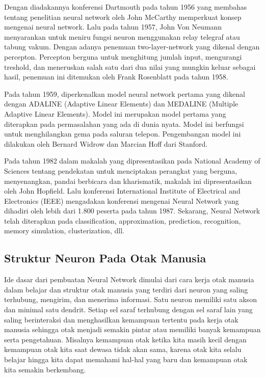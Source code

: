 Dengan diadakannya konferensi Dartmouth pada tahun 1956 yang membahas tentang penelitian neural network oleh John McCarthy memperkuat konsep mengenai neural network. Lalu pada tahun 1957, John Von Neumann menyarankan untuk meniru fungsi neuron menggunakan relay telegraf atau tabung vakum. Dengan adanya penemuan two-layer-network yang dikenal dengan percepton. Percepton berguna untuk menghitung jumlah input, mengurangi treshold, dan meneruskan salah satu dari dua nilai yang mungkin keluar sebagai hasil, penemuan ini ditemukan oleh Frank Rosenblatt pada tahun 1958. 

Pada tahun 1959, diperkenalkan model neural network pertama yang dikenal dengan ADALINE (Adaptive Linear Elements) dan MEDALINE (Multiple Adaptive Linear Elements). Model ini merupakan model pertama yang diterapkan pada permasalahan yang ada di dunia nyata. Model ini berfungsi untuk menghilangkan gema pada saluran telepon. Pengembangan model ini dilakukan oleh Bernard Widrow dan Marcian Hoff dari Stanford.

Pada tahun 1982 dalam makalah yang dipresentasikan pada National Academy of Sciences tentang pendekatan untuk menciptakan perangkat yang berguna, menyenangkan, pandai berbicara dan kharismatik, makalah ini dipresentasikan oleh John Hopfield. Lalu konferensi International Institute of Electrical and Electronics (IEEE) mengadakan konferensi mengenai Neural Network yang dihadiri oleh lebih dari 1.800 peserta pada tahun 1987. Sekarang, Neural Network telah diterapkan pada classification, approximation, prediction, recognition, memory simulation, clusterization, dll. 

\subsection{Struktur Neuron Pada Otak Manusia}
Ide dasar dari pembuatan Neural Network dimulai dari cara kerja otak manusia dalam belajar dan struktur otak manusia yang terdiri dari neuron yang saling terhubung, mengirim, dan menerima informasi. Satu neuron memiliki satu akson dan minimal satu dendrit. Setiap sel saraf terhubung dengan sel saraf lain yang saling berinteraksi dan menghasilkan kemampuan tertentu pada kerja otak manusia sehingga otak menjadi semakin pintar atau memiliki banyak kemampuan serta pengetahuan. Misalnya kemampuan otak ketika kita masih kecil dengan kemampuan otak kita saat dewasa tidak akan sama, karena otak kita selalu belajar hingga kita dapat memahami hal-hal yang baru dan kemampuan otak kita semakin berkembang.

